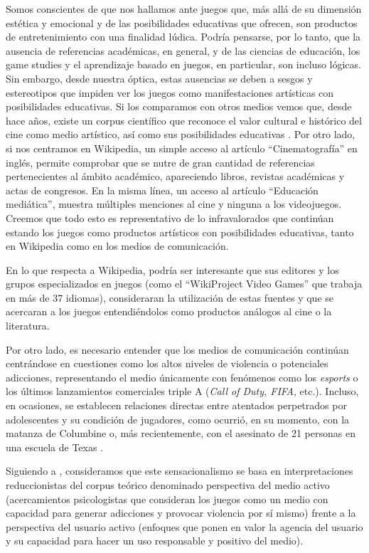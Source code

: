 \documentclass[spanish]{textolivre}
\begin{document}
Somos conscientes de que nos hallamos ante juegos que, más allá de su dimensión estética y emocional y de las posibilidades educativas que ofrecen, son productos de entretenimiento con una finalidad lúdica. Podría pensarse, por lo tanto, que la ausencia de referencias académicas, en general, y de las ciencias de educación, los game studies y el aprendizaje basado en juegos, en particular, son incluso lógicas. Sin embargo, desde nuestra óptica, estas ausencias se deben a sesgos y estereotipos que impiden ver los juegos como manifestaciones artísticas con posibilidades educativas. Si los comparamos con otros medios vemos que, desde hace años, existe un corpus científico que reconoce el valor cultural e histórico del cine como medio artístico, así como sus posibilidades educativas \cite{pegrum_contemporary_2005}. Por otro lado, si nos centramos en Wikipedia, un simple acceso al artículo “Cinematografía” en inglés, permite comprobar que se nutre de gran cantidad de referencias pertenecientes al ámbito académico, apareciendo libros, revistas académicas y actas de congresos. En la misma línea, un acceso al artículo “Educación mediática”, muestra múltiples menciones al cine y ninguna a los videojuegos. Creemos que todo esto es representativo de lo infravalorados que continúan estando los juegos como productos artísticos con posibilidades educativas, tanto en Wikipedia como en los medios de comunicación.

En lo que respecta a Wikipedia, podría ser interesante que sus editores y los grupos especializados en juegos (como el “WikiProject Video Games” que trabaja en más de 37 idiomas), consideraran la utilización de estas fuentes y que se acercaran a los juegos entendiéndolos como productos análogos al cine o la literatura.

Por otro lado, es necesario entender que los medios de comunicación continúan centrándose en cuestiones como los altos niveles de violencia o potenciales adicciones, representando el medio únicamente con fenómenos como los \emph{esports} o los últimos lanzamientos comerciales triple A (\emph{Call of Duty, FIFA}, etc.). Incluso, en ocasiones, se establecen relaciones directas entre atentados perpetrados por adolescentes y su condición de jugadores, como ocurrió, en su momento, con la matanza de Columbine o, más recientemente, con el asesinato de 21 personas en una escuela de Texas \cite{gallego2022}.

Siguiendo a \textcite{egenfeldt2021understanding}, consideramos que este sensacionalismo se basa en interpretaciones reduccionistas del corpus teórico denominado perspectiva del medio activo (acercamientos psicologistas que consideran los juegos como un medio con capacidad para generar adicciones y provocar violencia por sí mismo) frente a la perspectiva del usuario activo (enfoques que ponen en valor la agencia del usuario y su capacidad para hacer un uso responsable y positivo del medio).
\end{document}
